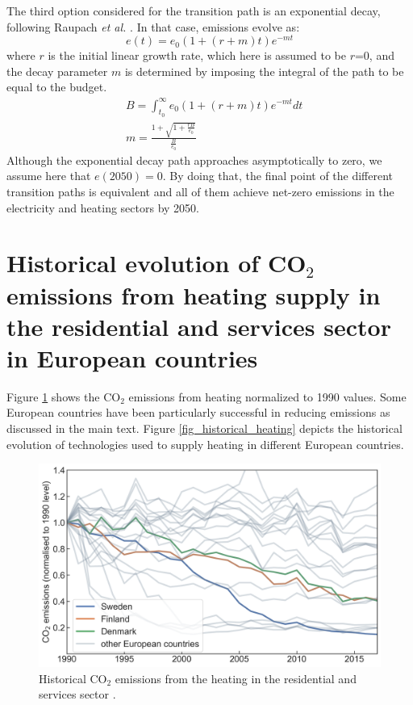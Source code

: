 \documentclass[3p]{elsarticle} %
\begin{document}
The third option considered for the transition path is an exponential decay, following Raupach \textit{et al. }\cite{Raupach_2014}. In that case, emissions evolve as:
\begin{equation}
e(t) = e_0(1+(r+m)t)e^{-mt}
\end{equation}
where $r$ is the initial linear growth rate, which here is assumed to be $r$=0, and the decay parameter $m$ is determined by imposing the integral of the path to be equal to the budget.
\begin{equation}
\begin{aligned}
& B=\int_{t_0}^{\infty} e_0(1+(r+m)t)e^{-mt} dt \\
& m=\frac{1+ \sqrt{1+\frac{rB}{e_0}}}{\frac{B}{e_0}}
\end{aligned}
\end{equation}
Although the exponential decay path approaches asymptotically to zero, we assume here that $e(2050)=0$. By doing that, the final point of the different transition paths is equivalent and all of them achieve net-zero emissions in the electricity and heating sectors by 2050.

\FloatBarrier

\newpage

\section{Historical evolution of CO$_2$ emissions from heating supply in the residential and services sector in European countries}
Figure \ref{fig_emissions_heating} shows the CO$_2$ emissions from heating normalized to 1990 values. Some European countries have been particularly successful in reducing emissions as discussed in the main text. Figure \ref{fig_historical_heating} depicts the historical evolution of technologies used to supply heating in different European countries. 

\begin{figure}[!h]
\centering
\includegraphics[width=12cm]{../figures/emissions_heating.png}
\caption{Historical CO$_2$ emissions from the heating in the residential and services sector \cite{UNFCCC_inventory}. } \label{fig_emissions_heating} 
\end{figure}
\end{document}
